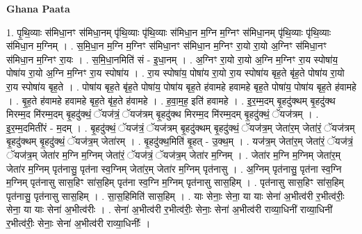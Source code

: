 \documentclass[17pt]{extarticle}
\begin{document}
\textbf{Ghana Paata } \newline

1. पृ॒थि॒व्याः स॑मिधा॒नꣳ स॑मिधा॒नम् पृ॑थि॒व्याः पृ॑थि॒व्याः स॑मिधा॒न म॒ग्नि म॒ग्निꣳ स॑मिधा॒नम् पृ॑थि॒व्याः पृ॑थि॒व्याः स॑मिधा॒न म॒ग्निम् । . स॒मि॒धा॒न म॒ग्नि म॒ग्निꣳ स॑मिधा॒नꣳ स॑मिधा॒न म॒ग्निꣳ रा॒यो रा॒यो अ॒ग्निꣳ स॑मिधा॒नꣳ स॑मिधा॒न म॒ग्निꣳ रा॒यः । . स॒मि॒धा॒नमिति॑ सं - इ॒धा॒नम् । . अ॒ग्निꣳ रा॒यो रा॒यो अ॒ग्नि म॒ग्निꣳ रा॒य स्पोषा॑य॒ पोषा॑य रा॒यो अ॒ग्नि म॒ग्निꣳ रा॒य स्पोषा॑य । . रा॒य स्पोषा॑य॒ पोषा॑य रा॒यो रा॒य स्पोषा॑य बृह॒ते बृ॑ह॒ते पोषा॑य रा॒यो रा॒य स्पोषा॑य बृह॒ते । . पोषा॑य बृह॒ते बृ॑ह॒ते पोषा॑य॒ पोषा॑य बृह॒ते ह॑वामहे हवामहे बृह॒ते पोषा॑य॒ पोषा॑य बृह॒ते ह॑वामहे । . बृ॒ह॒ते ह॑वामहे हवामहे बृह॒ते बृ॑ह॒ते ह॑वामहे । . ह॒वा॒म॒ह॒ इति॑ हवामहे । . इ॒र॒म्म॒दम् बृ॒हदु॑क्थम् बृ॒हदु॑क्थ मिरम्म॒द मि॑रम्म॒दम् बृ॒हदु॑क्थं॒ ॅयज॑त्रं॒ ॅयज॑त्रम् बृ॒हदु॑क्थ मिरम्म॒द मि॑रम्म॒दम् बृ॒हदु॑क्थं॒ ॅयज॑त्रम् । . इ॒र॒म्म॒दमिती॑रं - म॒दम् । . बृ॒हदु॑क्थं॒ ॅयज॑त्रं॒ ॅयज॑त्रम् बृ॒हदु॑क्थम् बृ॒हदु॑क्थं॒ ॅयज॑त्र॒म् जेता॑र॒म् जेता॑रं॒ ॅयज॑त्रम् बृ॒हदु॑क्थम् बृ॒हदु॑क्थं॒ ॅयज॑त्र॒म् जेता॑रम् । . बृ॒हदु॑क्थ॒मिति॑ बृ॒हत् - उ॒क्थ॒म् । . यज॑त्र॒म् जेता॑र॒म् जेता॑रं॒ ॅयज॑त्रं॒ ॅयज॑त्र॒म् जेता॑र म॒ग्नि म॒ग्निम् जेता॑रं॒ ॅयज॑त्रं॒ ॅयज॑त्र॒म् जेता॑र म॒ग्निम् । . जेता॑र म॒ग्नि म॒ग्निम् जेता॑र॒म् जेता॑र म॒ग्निम् पृत॑नासु॒ पृत॑ना स्व॒ग्निम् जेता॑र॒म् जेता॑र म॒ग्निम् पृत॑नासु । . अ॒ग्निम् पृत॑नासु॒ पृत॑ना स्व॒ग्नि म॒ग्निम् पृत॑नासु सास॒हिꣳ सा॑स॒हिम् पृत॑ना स्व॒ग्नि म॒ग्निम् पृत॑नासु सास॒हिम् । . पृत॑नासु सास॒हिꣳ सा॑स॒हिम् पृत॑नासु॒ पृत॑नासु सास॒हिम् । . सा॒स॒हिमिति॑ सास॒हिम् । . याः सेनाः॒ सेना॒ या याः सेना॑ अ॒भीत्व॑री र॒भीत्व॑रीः॒ सेना॒ या याः सेना॑ अ॒भीत्व॑रीः । . सेना॑ अ॒भीत्व॑री र॒भीत्व॑रीः॒ सेनाः॒ सेना॑ अ॒भीत्व॑री राव्या॒धिनी॑ राव्या॒धिनी॑ र॒भीत्व॑रीः॒ सेनाः॒ सेना॑ अ॒भीत्व॑री राव्या॒धिनीः᳚ । \newline
\end{document}
